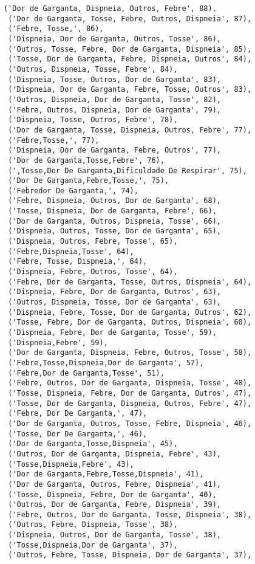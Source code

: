 \documentclass[11pt]{article}
\begin{document}
\begin{tcolorbox}[breakable, size=fbox, boxrule=.5pt, pad at break*=1mm, opacityfill=0]
\begin{Verbatim}[commandchars=\\\{\}]
 ('Dor de Garganta, Dispneia, Outros, Febre', 88),
 ('Dor de Garganta, Tosse, Febre, Outros, Dispneia', 87),
 ('Febre, Tosse,', 86),
 ('Dispneia, Dor de Garganta, Outros, Tosse', 86),
 ('Outros, Tosse, Febre, Dor de Garganta, Dispneia', 85),
 ('Tosse, Dor de Garganta, Febre, Dispneia, Outros', 84),
 ('Outros, Dispneia, Tosse, Febre', 84),
 ('Dispneia, Tosse, Outros, Dor de Garganta', 83),
 ('Dispneia, Dor de Garganta, Febre, Tosse, Outros', 83),
 ('Outros, Dispneia, Dor de Garganta, Tosse', 82),
 ('Febre, Outros, Dispneia, Dor de Garganta', 79),
 ('Dispneia, Tosse, Outros, Febre', 78),
 ('Dor de Garganta, Tosse, Dispneia, Outros, Febre', 77),
 ('Febre,Tosse,', 77),
 ('Dispneia, Dor de Garganta, Febre, Outros', 77),
 ('Dor de Garganta,Tosse,Febre', 76),
 (',Tosse,Dor De Garganta,Dificuldade De Respirar', 75),
 ('Dor De Garganta,Febre,Tosse,', 75),
 ('Febredor De Garganta,', 74),
 ('Febre, Dispneia, Outros, Dor de Garganta', 68),
 ('Tosse, Dispneia, Dor de Garganta, Febre', 66),
 ('Dor de Garganta, Outros, Dispneia, Tosse', 66),
 ('Dispneia, Outros, Tosse, Dor de Garganta', 65),
 ('Dispneia, Outros, Febre, Tosse', 65),
 ('Febre,Dispneia,Tosse', 64),
 ('Febre, Tosse, Dispneia,', 64),
 ('Dispneia, Febre, Outros, Tosse', 64),
 ('Febre, Dor de Garganta, Tosse, Outros, Dispneia', 64),
 ('Dispneia, Febre, Dor de Garganta, Outros', 63),
 ('Outros, Dispneia, Tosse, Dor de Garganta', 63),
 ('Dispneia, Febre, Tosse, Dor de Garganta, Outros', 62),
 ('Tosse, Febre, Dor de Garganta, Outros, Dispneia', 60),
 ('Dispneia, Febre, Dor de Garganta, Tosse', 59),
 ('Dispneia,Febre', 59),
 ('Dor de Garganta, Dispneia, Febre, Outros, Tosse', 58),
 ('Febre,Tosse,Dispneia,Dor de Garganta', 57),
 ('Febre,Dor de Garganta,Tosse', 51),
 ('Febre, Outros, Dor de Garganta, Dispneia, Tosse', 48),
 ('Tosse, Dispneia, Febre, Dor de Garganta, Outros', 47),
 ('Tosse, Dor de Garganta, Dispneia, Outros, Febre', 47),
 ('Febre, Dor De Garganta,', 47),
 ('Dor de Garganta, Outros, Tosse, Febre, Dispneia', 46),
 ('Tosse, Dor De Garganta,', 46),
 ('Dor de Garganta,Tosse,Dispneia', 45),
 ('Outros, Dor de Garganta, Dispneia, Febre', 43),
 ('Tosse,Dispneia,Febre', 43),
 ('Dor de Garganta,Febre,Tosse,Dispneia', 41),
 ('Dor de Garganta, Outros, Febre, Dispneia', 41),
 ('Tosse, Dispneia, Febre, Dor de Garganta', 40),
 ('Outros, Dor de Garganta, Febre, Dispneia', 39),
 ('Febre, Outros, Dor de Garganta, Tosse, Dispneia', 38),
 ('Outros, Febre, Dispneia, Tosse', 38),
 ('Dispneia, Outros, Dor de Garganta, Tosse', 38),
 ('Tosse,Dispneia,Dor de Garganta', 37),
 ('Outros, Febre, Tosse, Dispneia, Dor de Garganta', 37),

\end{Verbatim}
\end{tcolorbox}
\end{document}
